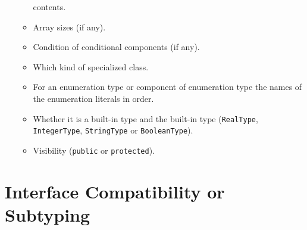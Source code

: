 \begin{itemize}
\begin{itemize}
    contents.
  \item
    Array sizes (if any).
  \item
    Condition of conditional components (if any).
  \item
    Which kind of specialized class.
  \item
    For an enumeration type or component of enumeration type the names
    of the enumeration literals in order.
  \item
    Whether it is a built-in type and the built-in type (\lstinline!RealType!,
    \lstinline!IntegerType!, \lstinline!StringType! or \lstinline!BooleanType!).
  \item
    Visibility (\lstinline!public! or \lstinline!protected!).
  \end{itemize}
\end{itemize}

\section{Interface Compatibility or Subtyping}\label{interface-compatibility-or-subtyping}

